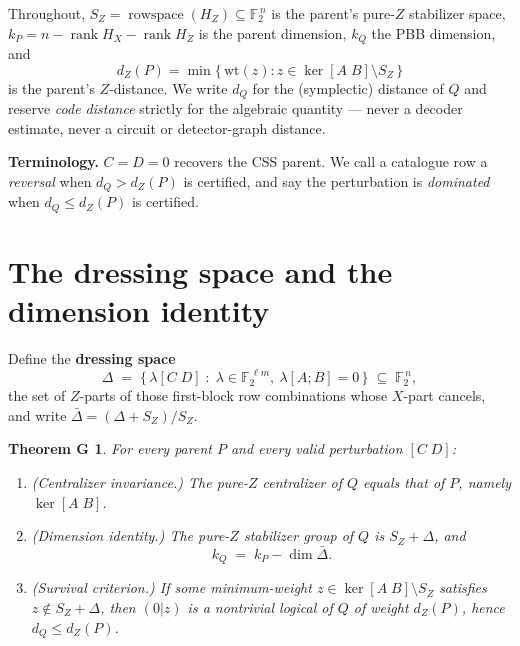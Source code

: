 \documentclass[11pt]{article}
\theoremstyle{plain}
\newtheorem*{theoremG}{Theorem G}
\theoremstyle{remark}
\begin{document}
Throughout, $S_Z=\operatorname{rowspace}(H_Z)\subseteq\mathbb{F}_2^{\,n}$ is the parent's
pure-$Z$ stabilizer space, $k_P=n-\operatorname{rank}H_X-\operatorname{rank}H_Z$ is the
parent dimension, $k_Q$ the PBB dimension, and
\[
d_Z(P)=\min\{\,\mathrm{wt}(z) : z\in\ker[A\;B]\setminus S_Z\,\}
\]
is the parent's $Z$-distance. We write $d_Q$ for the (symplectic) distance of $Q$ and
reserve \emph{code distance} strictly for the algebraic quantity --- never a decoder estimate,
never a circuit or detector-graph distance.

\textbf{Terminology.} $C=D=0$ recovers the CSS parent. We call a catalogue row a \emph{reversal}
when $d_Q > d_Z(P)$ is certified, and say the perturbation is \emph{dominated} when
$d_Q \le d_Z(P)$ is certified.

\section{The dressing space and the dimension identity}\label{sec:dressing}

Define the \textbf{dressing space}
\[
\Delta \;=\; \big\{\, \lambda[C\;D] \;:\; \lambda\in\mathbb{F}_2^{\,\ell m},\ \lambda[A;B]=0 \,\big\} \;\subseteq\; \mathbb{F}_2^{\,n},
\]
the set of $Z$-parts of those first-block row combinations whose $X$-part cancels, and
write $\bar\Delta=(\Delta+S_Z)/S_Z$.

\begin{theoremG}
For every parent $P$ and every valid perturbation $[C\;D]$:
\begin{enumerate}
\item[(i)] \emph{(Centralizer invariance.)} The pure-$Z$ centralizer of $Q$ equals that of $P$, namely
   $\ker[A\;B]$.
\item[(ii)] \emph{(Dimension identity.)} The pure-$Z$ stabilizer group of $Q$ is $S_Z+\Delta$, and
   \[
   k_Q \;=\; k_P - \dim\bar\Delta .
   \]
\item[(iii)] \emph{(Survival criterion.)} If some minimum-weight $z\in\ker[A\;B]\setminus S_Z$ satisfies
   $z\notin S_Z+\Delta$, then $(0|z)$ is a nontrivial logical of $Q$ of weight $d_Z(P)$,
   hence $d_Q\le d_Z(P)$.
\end{enumerate}
\end{theoremG}
\end{document}
